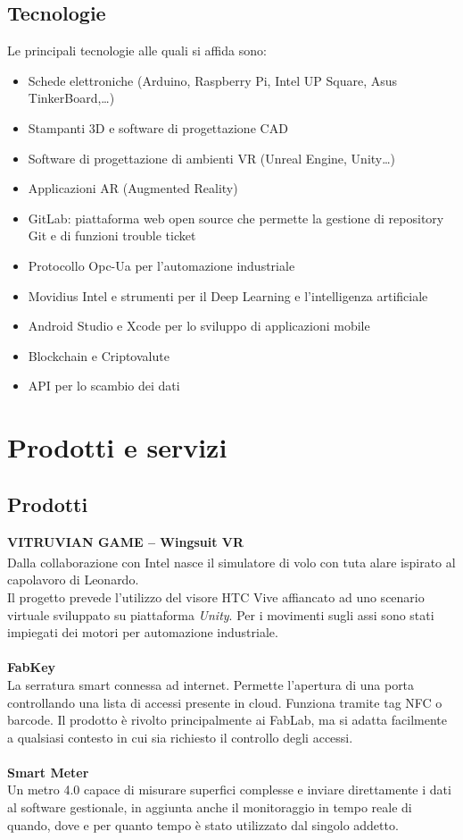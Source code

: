 \subsection{Tecnologie}
Le principali tecnologie alle quali \lab{} si affida sono:
\begin{itemize}
\item Schede elettroniche (Arduino, Raspberry Pi, Intel UP Square, Asus TinkerBoard,…)
\item Stampanti 3D e software di progettazione CAD
\item Software di progettazione di ambienti VR (Unreal Engine, Unity…)
\item Applicazioni AR (Augmented Reality)
\item GitLab: piattaforma web open source che permette la gestione di repository Git e di funzioni trouble ticket
\item Protocollo Opc-Ua per l’automazione industriale 
\item Movidius Intel e strumenti per il Deep Learning e l’intelligenza artificiale
\item Android Studio e Xcode per lo sviluppo di applicazioni mobile
\item Blockchain e Criptovalute 
\item API per lo scambio dei dati
\end{itemize}

\newpage
\section{Prodotti e servizi}
\subsection{Prodotti}
\textbf{VITRUVIAN GAME – Wingsuit VR}
\\
Dalla collaborazione con Intel\textsuperscript{\textregistered} nasce il simulatore di volo con tuta alare ispirato al capolavoro di Leonardo.\\
Il progetto prevede l'utilizzo del visore HTC Vive affiancato ad uno scenario virtuale sviluppato su piattaforma \textit{Unity}. Per i movimenti sugli assi sono stati impiegati dei motori per automazione industriale.
\\
\\
\textbf{FabKey}
\\
La serratura smart connessa ad internet. Permette l'apertura di una porta controllando una lista di accessi presente in cloud. Funziona tramite tag \gls{NFC} o barcode. Il prodotto è rivolto principalmente ai \gls{FabLab}, ma si adatta facilmente a qualsiasi contesto in cui sia richiesto il controllo degli accessi.
\\
\\
\textbf{Smart Meter}
\\
Un metro 4.0 capace di misurare superfici complesse e inviare direttamente i dati al software gestionale, in aggiunta anche il monitoraggio in tempo reale di quando, dove e per quanto tempo è stato utilizzato dal singolo addetto.


